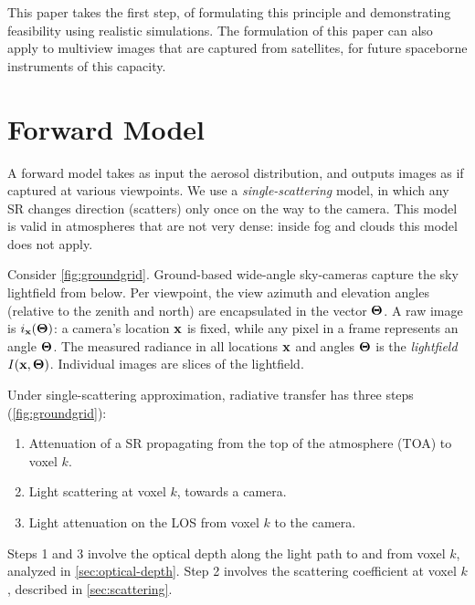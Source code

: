 \documentclass[10pt,letterpaper]{article}
\begin{document}
This paper takes the first step, of formulating this principle and
demonstrating feasibility using realistic simulations. The formulation
of this paper can also apply to multiview images that are captured
from satellites, for future spaceborne instruments of this capacity.



\section{Forward Model}
\label{sec:skymodel}

A forward model takes as input the aerosol distribution, and outputs
images as if captured at various viewpoints.  We use a
\emph{single-scattering} model, in which any SR changes direction
(scatters) only once on the way to the camera. This model is valid in
atmospheres that are not very dense: inside fog and clouds this model
does not apply.

Consider \cref{fig:groundgrid}.  Ground-based wide-angle sky-cameras
capture the sky lightfield from below. Per viewpoint, the view azimuth
and elevation angles (relative to the zenith and north) are
encapsulated in the vector ${\bf{\Theta}}$.  A raw image is $i_{\bf
  x}({\bf{\Theta}})$: a camera's location ${\bf x}$ is fixed, while
any pixel in a frame represents an angle ${\bf{\Theta}}$.  The
measured radiance in all locations ${\bf x}$ and angles
${\bf{\Theta}}$ is the {\em lightfield} $I({\bf
  x},{\bf{\Theta}})$. Individual images are slices of the lightfield.

Under single-scattering approximation, radiative transfer has three
steps (\cref{fig:groundgrid}):
\begin{enumerate}
\item Attenuation of a SR propagating from the top of the atmosphere
  (TOA) to voxel $k$.
\item Light scattering at voxel $k$, towards a camera.
\item Light attenuation on the LOS from voxel $k$ to the camera.
\end{enumerate}

Steps 1 and 3 involve the optical depth along the light path to and
from voxel $k$, analyzed in \cref{sec:optical-depth}.  Step 2 involves
the scattering coefficient at voxel $k$, described in
\cref{sec:scattering}.

\end{document}
